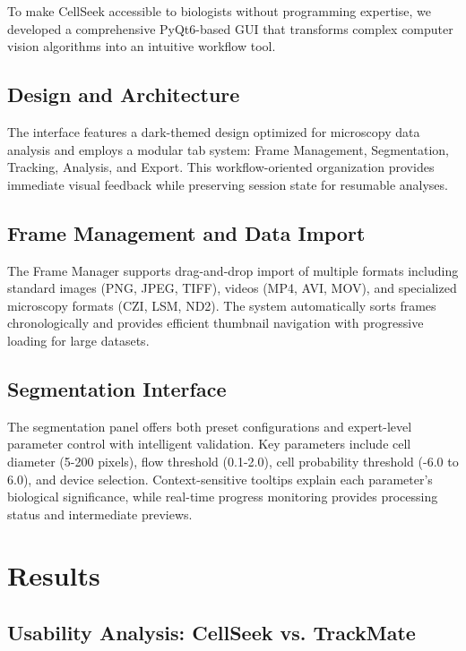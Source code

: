 \documentclass[12pt]{article}
\begin{document}

To make CellSeek accessible to biologists without programming expertise, we developed a comprehensive PyQt6-based GUI that transforms complex computer vision algorithms into an intuitive workflow tool.

\subsection{Design and Architecture}

The interface features a dark-themed design optimized for microscopy data analysis and employs a modular tab system: Frame Management, Segmentation, Tracking, Analysis, and Export. This workflow-oriented organization provides immediate visual feedback while preserving session state for resumable analyses.

\subsection{Frame Management and Data Import}

The Frame Manager supports drag-and-drop import of multiple formats including standard images (PNG, JPEG, TIFF), videos (MP4, AVI, MOV), and specialized microscopy formats (CZI, LSM, ND2). The system automatically sorts frames chronologically and provides efficient thumbnail navigation with progressive loading for large datasets.

\subsection{Segmentation Interface}

The segmentation panel offers both preset configurations and expert-level parameter control with intelligent validation. Key parameters include cell diameter (5-200 pixels), flow threshold (0.1-2.0), cell probability threshold (-6.0 to 6.0), and device selection. Context-sensitive tooltips explain each parameter's biological significance, while real-time progress monitoring provides processing status and intermediate previews.

\section{Results}

\subsection{Usability Analysis: CellSeek vs. TrackMate}
\end{document}
